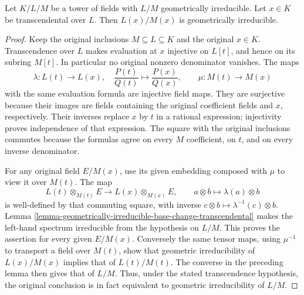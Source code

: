 \begin{lemma}
\label{lemma-geometrically-irreducible-add-transcendental}
Let $K/L/M$ be a tower of fields with $L/M$ geometrically irreducible.
Let $x \in K$ be transcendental over $L$. Then $L(x)/M(x)$ is geometrically
irreducible.
\end{lemma}

\begin{proof}
Keep the original inclusions
$M\subseteq L\subseteq K$ and
the original $x\in K$.
Transcendence over $L$ makes
evaluation at $x$ injective on
$L[t]$, and hence on its subring
$M[t]$. In particular no original
nonzero denominator vanishes.
The maps
$$
\lambda:L(t)\longrightarrow L(x),\quad
\frac{P(t)}{Q(t)}\longmapsto\frac{P(x)}{Q(x)},
\qquad
\mu:M(t)\longrightarrow M(x)
$$
with the same evaluation formula
are injective field maps. They
are surjective because their
images are fields containing the
original coefficient fields and
$x$, respectively. Their inverses
replace $x$ by $t$ in a rational
expression; injectivity proves
independence of that expression.
The square with the original
inclusions commutes because the
formulas agree on every $M$
coefficient, on $t$, and on
every inverse denominator.

For any original field $E/M(x)$,
use its given embedding composed
with $\mu$ to view it over $M(t)$.
The map
$$
L(t)\otimes_{M(t)}E\longrightarrow L(x)\otimes_{M(x)}E,
\qquad a\otimes b\longmapsto\lambda(a)\otimes b
$$
is well-defined by that commuting
square, with inverse
$c\otimes b\mapsto\lambda^{-1}(c)\otimes b$.
Lemma
\ref{lemma-geometrically-irreducible-base-change-transcendental}
makes the left-hand spectrum
irreducible from the hypothesis
on $L/M$. This proves the assertion
for every given $E/M(x)$.
Conversely the same tensor maps,
using $\mu^{-1}$ to transport a
field over $M(t)$, show that
geometric irreducibility of
$L(x)/M(x)$ implies that of
$L(t)/M(t)$. The converse in the
preceding lemma then gives that
of $L/M$. Thus, under the stated
transcendence hypothesis, the
original conclusion is in fact
equivalent to geometric
irreducibility of $L/M$.
\end{proof}